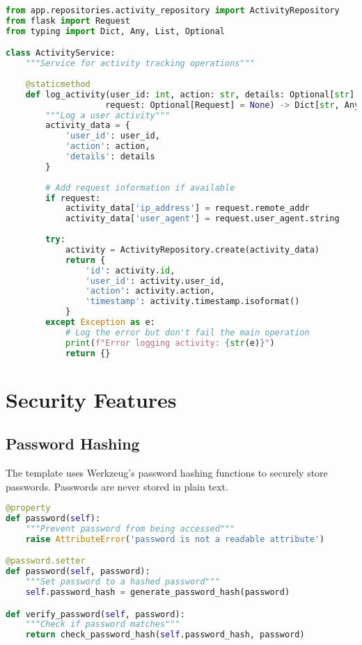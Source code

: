 \documentclass{article}
\begin{document}
\begin{lstlisting}[language=python, caption=Activity Service in app/services/activity\_service.py]
from app.repositories.activity_repository import ActivityRepository
from flask import Request
from typing import Dict, Any, List, Optional

class ActivityService:
    """Service for activity tracking operations"""
    
    @staticmethod
    def log_activity(user_id: int, action: str, details: Optional[str] = None, 
                    request: Optional[Request] = None) -> Dict[str, Any]:
        """Log a user activity"""
        activity_data = {
            'user_id': user_id,
            'action': action,
            'details': details
        }
        
        # Add request information if available
        if request:
            activity_data['ip_address'] = request.remote_addr
            activity_data['user_agent'] = request.user_agent.string
        
        try:
            activity = ActivityRepository.create(activity_data)
            return {
                'id': activity.id,
                'user_id': activity.user_id,
                'action': activity.action,
                'timestamp': activity.timestamp.isoformat()
            }
        except Exception as e:
            # Log the error but don't fail the main operation
            print(f"Error logging activity: {str(e)}")
            return {}
\end{lstlisting}

\section{Security Features}

\subsection{Password Hashing}

The template uses Werkzeug's password hashing functions to securely store passwords. Passwords are never stored in plain text.

\begin{lstlisting}[language=python, caption=Password Hashing in app/models/user.py]
@property
def password(self):
    """Prevent password from being accessed"""
    raise AttributeError('password is not a readable attribute')

@password.setter
def password(self, password):
    """Set password to a hashed password"""
    self.password_hash = generate_password_hash(password)

def verify_password(self, password):
    """Check if password matches"""
    return check_password_hash(self.password_hash, password)
\end{lstlisting}
\end{document}
